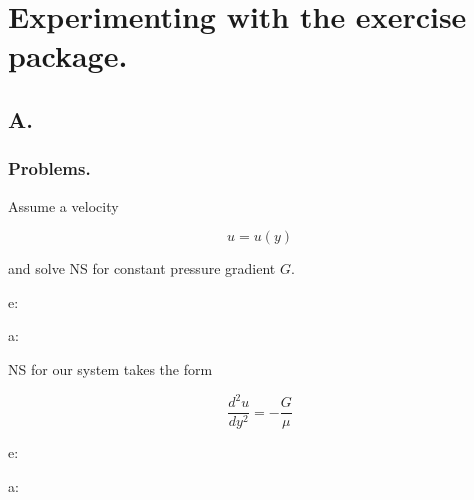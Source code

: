 


\usepackage[answerdelayed]{exercise}
\usepackage[]{caption}
\chapter{Experimenting with the exercise package.}

\label{chap:template}
\date{May 10, 2012}
\keywords{}

\beginArtNoToc

\section{A.}

\subsection{Problems.}


\begin{Exercise}[title={1d fluid flow}, label={problem:ps1q1}
]

Assume a velocity 

\begin{equation}\label{eqn:fourierSeries:10}
u = u(y)
\end{equation}

and solve NS for constant pressure gradient $G$.

e: \theExercise

a: \theAnswer


\end{Exercise}

\begin{Answer}[ref={problem:ps1q1}]

NS for our system takes the form

\begin{equation}\label{eqn:fourierSeries:30}
\frac{d^2 u}{dy^2} = -\frac{G}{\mu}
\end{equation}

e: \theExercise

a: \theAnswer


\end{Answer}

